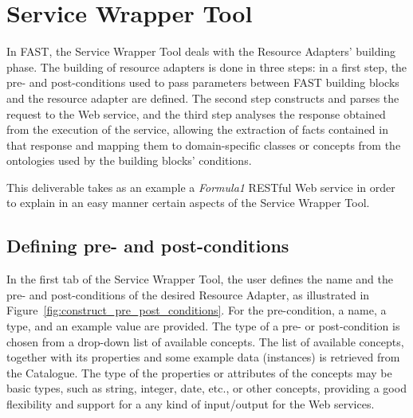 \documentclass{fast_latex}
\begin{document}
\clearpage
\section{Service Wrapper Tool} %
\label{sec:restful_web_services_wrapper_tool}

In FAST, the Service Wrapper Tool deals with the Resource Adapters' building phase. The building of resource adapters is done in three steps: in a first step, the pre- and post-conditions used to pass parameters between FAST building blocks and the resource adapter are defined. The second step constructs and parses the request to the Web service, and the third step analyses the response obtained from the execution of the service, allowing the extraction of facts contained in that response and mapping them to domain-specific classes or concepts from the ontologies used by the building blocks' conditions.

This deliverable takes as an example a \emph{Formula1} RESTful Web service in order to explain in an easy manner certain aspects of the Service Wrapper Tool.

\subsection{Defining pre- and post-conditions} %
\label{sub:resource_adapter_parameters}

In the first tab of the Service Wrapper Tool, the user defines the name and the pre- and post-conditions of the desired Resource Adapter, as illustrated in Figure~\ref{fig:construct_pre_post_conditions}. For the pre-condition, a name, a type, and an example value are provided. The type of a pre- or post-condition is chosen from a drop-down list of available concepts. The list of available concepts, together with its properties and some example data (instances) is retrieved from the Catalogue. The type of the properties or attributes of the concepts may be basic types, such as string, integer, date, etc., or other concepts, providing a good flexibility and support for a any kind of input/output for the Web services.
\end{document}
